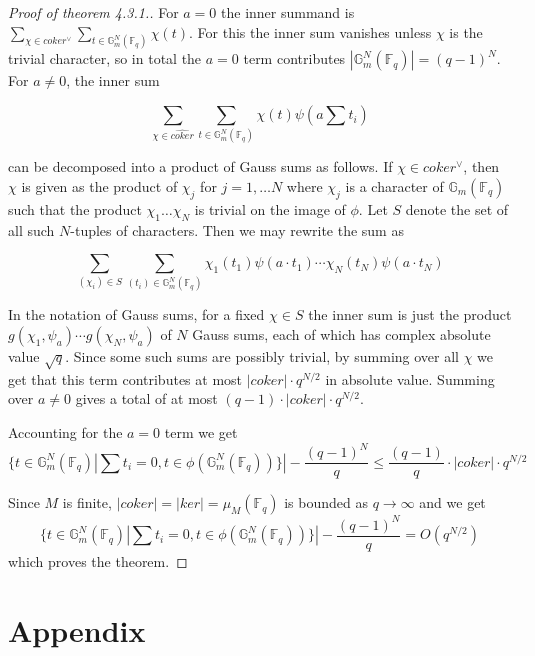 \documentclass{ucbthesis}
\theoremstyle{definition}
\theoremstyle{theorem}
\begin{document}
\begin{proof}[Proof of theorem 4.3.1.]
For $a=0$ the inner summand is $\sum\limits_{\chi\in coker^{\vee}}\sum\limits_{t\in\mathbb{G}_{m}^{N}(\mathbb{F}_q)}
 \chi(t)$. For this the inner sum vanishes unless $\chi$ is the trivial character, so in total the $a=0$ term
  contributes $|\mathbb{G}_{m}^{N}(\mathbb{F}_{q})| = (q-1)^{N}$. For $a\neq 0$, the inner sum 
  
$$\sum\limits_{\chi\in \hat{coker}}\sum\limits_{t\in\mathbb{G}_{m}^{N}(\mathbb{F}_q)} \chi(t)\psi(a\sum t_{i})$$ 

can be decomposed into a product of Gauss sums as follows. If $\chi \in coker^{\vee}$, then $\chi$ is given as the
 product of $\chi_{j}$ for $j=1,\ldots N$ where $\chi_{j}$ is a character of $\mathbb{G}_{m}(\mathbb{F}_q)$
  such that the product $\chi_{1}\ldots \chi_{N}$ is trivial on the image of $\phi$. Let $S$ denote the set of all
   such $N$-tuples of characters. Then we may rewrite the sum as 

$$\sum\limits_{(\chi_{i})\in S}\sum\limits_{(t_{i})\in\mathbb{G}_{m}^{N}(\mathbb{F}_q)} \chi_{1
}(t_{1})\psi(a\cdot t_{1})\cdots \chi_{N}(t_{N})\psi(a\cdot t_{N})$$

In the notation of Gauss sums, for a fixed $\chi \in S$ the inner sum is just the product $g(\chi_{1},\psi_{a})\cdots g(\chi_{N},\psi_{a})$ of $N$ Gauss sums, each of which has complex
 absolute value $\sqrt{q}$. Since some such sums are possibly trivial, by summing over all $\chi$ we get that this term
  contributes at most $|coker|\cdot q^{N/2}$ in absolute value. Summing over $a\neq 0$ gives a total of at most $(q-1)\cdot 
  |coker| \cdot q^{N/2}$. 

Accounting for the $a=0$ term we get  
$$\{t\in \mathbb{G}_{m}^{N}(\mathbb{F}_q)|\sum t_{i} = 0, t\in\phi(\mathbb{G}_{m}^{N}(\mathbb{F}_q))\}| - \frac{(q-1)^{N}}{q} \leq \frac{(q-1)}{q}\cdot |coker| \cdot q^{N/2}$$

Since $M$ is finite, $|coker|=|ker| = \mu_{M}(\mathbb{F}_q)$ is bounded as $q\rightarrow \infty$ and we get 
$$\{t\in \mathbb{G}_{m}^{N}(\mathbb{F}_q)|\sum t_{i} = 0, t\in\phi(\mathbb{G}_{m}^{N}(\mathbb{F}_q))\}| - \frac{(q-1)^{N}}{q} = O(q^{N/2})$$
which proves the theorem. 

\end{proof}
\chapter{Appendix}
\end{document}
